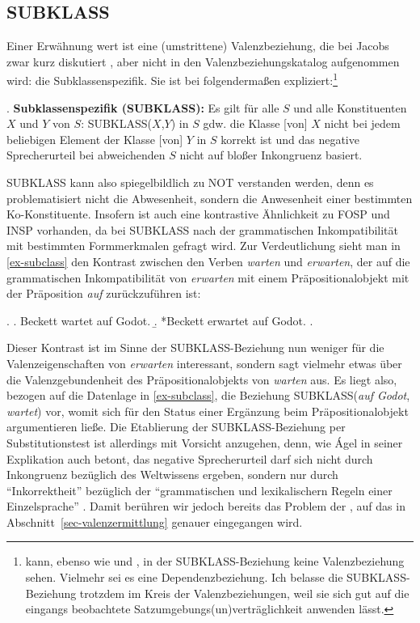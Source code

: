 

\subsection{SUBKLASS}

Einer Erwähnung wert ist eine (umstrittene) Valenzbeziehung, die bei Jacobs zwar kurz diskutiert \citep[26]{Jacobs:94}, aber nicht in den Valenzbeziehungskatalog aufgenommen wird: die Subklassenspezifik. Sie ist bei \citet[187]{Agel:00} folgenderma\ss en expliziert:\footnote{\citet[190f]{Agel:00} kann, ebenso wie \cite{Jacobs:94} und \cite{Vater:78},  in der SUBKLASS-Beziehung keine Valenzbeziehung sehen. Vielmehr sei es eine Dependenzbeziehung. Ich belasse die SUBKLASS-Beziehung trotzdem im Kreis der Valenzbeziehungen, weil sie sich gut auf die eingangs beobachtete Satzumgebungs(un)verträglichkeit anwenden lässt.}

\ex. {\bf Subklassenspezifik (SUBKLASS):}  Es gilt für alle $S$ und alle Konstituenten $X$ und $Y$ von $S$: SUBKLASS($X$,$Y$) in $S$ gdw. die Klasse [von] $X$ nicht bei jedem beliebigen Element der Klasse [von] $Y$ in $S$ korrekt ist und das negative Sprecherurteil bei abweichenden $S$ nicht auf blo\ss er Inkongruenz basiert. 

SUBKLASS kann also spiegelbildlich zu NOT verstanden werden, denn es problematisiert nicht die Abwesenheit, sondern die Anwesenheit einer bestimmten Ko-Konstituente. Insofern ist auch eine kontrastive Ähnlichkeit zu FOSP und INSP vorhanden, da bei SUBKLASS nach der grammatischen Inkompatibilität mit bestimmten Formmerkmalen gefragt wird. Zur Verdeutlichung sieht man in \ref{ex-subclass} den Kontrast zwischen den Verben {\it warten} und {\it erwarten}, der auf die grammatischen Inkompatibilität von {\it erwarten} mit einem Präpositionalobjekt mit der Präposition {\it auf} zurückzuführen ist:  

\ex. \label{ex-subclass}
\a. Beckett wartet auf Godot.
\b. *Beckett erwartet auf Godot.
\z. \citep[187]{Agel:00}

Dieser Kontrast ist im Sinne der SUBKLASS-Beziehung nun weniger für die Valenzeigenschaften von {\it erwarten} interessant, sondern sagt vielmehr etwas über die Valenzgebundenheit des Präpositionalobjekts von {\it warten} aus. Es liegt also, bezogen auf die Datenlage in \ref{ex-subclass}, die Beziehung SUBKLASS({\it auf Godot}, {\it wartet}) vor, womit sich für den Status einer Ergänzung beim Präpositionalobjekt argumentieren lie\ss e. Die Etablierung der SUBKLASS-Beziehung per Substitutionstest ist allerdings mit Vorsicht anzugehen, denn, wie \'Agel in seiner Explikation auch betont, das negative Sprecherurteil darf sich nicht durch Inkongruenz bezüglich des Weltwissens ergeben, sondern nur durch "`Inkorrektheit"' bezüglich der "`grammatischen und lexikalischern Regeln einer Einzelsprache"' \citep[188]{Agel:00}. Damit berühren wir jedoch bereits das Problem der , auf das in Abschnitt~\ref{sec-valenzermittlung} genauer eingegangen wird.

